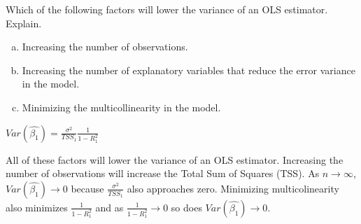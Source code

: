 \item Which of the following factors will lower the variance of an OLS estimator. Explain.
	\begin{enumerate}[a.] 
		\item Increasing the number of observations.
		\item Increasing the number of explanatory variables that reduce the error variance in the model.
		\item Minimizing the multicollinearity in the model.
	\end{enumerate}
	{\begin{center}{$Var(\hat{\beta_1}) = \frac{\sigma^2}{TSS_1} \frac{1}{1-R^2_1}$}\end{center}}
	All of these factors will lower the variance of an OLS estimator.  Increasing the number of observations will increase the Total Sum of Squares (TSS). As $n \rightarrow \infty$, $Var(\hat{\beta_1}) \rightarrow 0$  because $ \frac{\sigma^2}{TSS_1}$ also approaches zero.  Minimizing multicolinearity also minimizes $\frac{1}{1-R^2_1}$ and as $\frac{1}{1-R^2_1} \rightarrow 0$ so does $Var(\hat{\beta_1}) \rightarrow 0$.  
